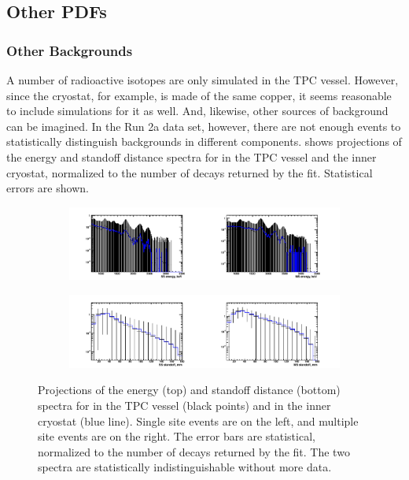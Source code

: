 \documentclass[herrin-thesis.tex]{subfiles}
\begin{document}
\subsection{Other PDFs}
\subsubsection{Other Backgrounds}
A number of radioactive isotopes are only simulated in the TPC vessel. However, since the cryostat, for example, is made of the same copper, it seems reasonable to include simulations for it as well. And, likewise, other sources of background can be imagined. In the Run 2a data set, however, there are not enough events to statistically distinguish backgrounds in different components.  shows projections of the energy and standoff distance spectra for  in the TPC vessel and the inner cryostat, normalized to the number of  decays returned by the fit. Statistical errors are shown.
 
\begin{figure}[tbp]
\centering
\begin{subfigure}[c]{\textwidth}
	\centering
	\includegraphics[trim = 1.25cm 0cm 1.25cm 0.5cm, clip=true, width=\textwidth]{./plots/analysis_degenerate_uranium_spectra_e.pdf}
\end{subfigure}
\begin{subfigure}[c]{\textwidth}
	\centering
	\includegraphics[trim = 1.25cm 0cm 1.25cm 0.5cm, clip=true, width=\textwidth]{./plots/analysis_degenerate_uranium_spectra_s.pdf}
\end{subfigure}
\caption[Lack of statistical power to distinguish the source of uranium backgrounds]{Projections of the energy (top) and standoff distance (bottom) spectra for  in the TPC vessel (black points) and in the inner cryostat (blue line). Single site events are on the left, and multiple site events are on the right. The error bars are statistical, normalized to the number of  decays returned by the fit. The two spectra are statistically indistinguishable without more data.}
\label{fig:analysis_degenerate_uranium_spectra}
\end{figure}
\end{document}
